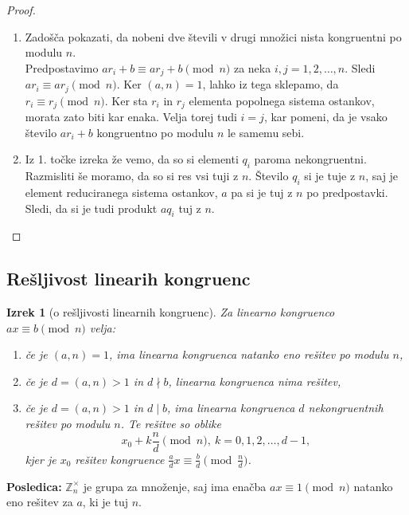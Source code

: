 \documentclass[12pt, a4paper]{article}
\newtheorem{izr}{Izrek}
\newenvironment{posl}[1][]{\par\medskip\noindent \textbf{Posledica: }}{\medskip}
\begin{document}
\begin{proof}
\begin{enumerate}
\item Zadošča pokazati, da nobeni dve števili v drugi množici nista kongruentni po modulu $n$.\\
Predpostavimo $ar_{i}+b\equiv ar_{j}+b \pmod n$ za neka $i,j =1,2,\ldots,n$. Sledi  $ar_{i}\equiv ar_{j} \pmod n$. Ker $(a,n)=1$, lahko iz tega sklepamo, da $r_{i} \equiv r_{j} \pmod n$. Ker sta $r_{i}$ in $r_{j}$ elementa popolnega sistema ostankov, morata zato biti kar enaka. Velja torej tudi $i=j$, kar pomeni, da je vsako število $ar_{i}+b$ kongruentno po modulu $n$ le samemu sebi.
\item Iz 1. točke izreka že vemo, da so si elementi $q_{i}$ paroma nekongruentni. Razmisliti še moramo, da so si res vsi tuji z $n$. Število $q_{i}$ si je tuje z $n$, saj je element reduciranega sistema ostankov, $a$ pa si je tuj z $n$ po predpostavki. Sledi, da si je tudi produkt $aq_{i}$ tuj z $n$.
\end{enumerate}
\end{proof}

\subsection{Rešljivost linearih kongruenc}

\begin{izr}[o rešljivosti linearnih kongruenc]
Za linearno kongruenco $ax\equiv b \pmod n$ velja:
\begin{enumerate}
\item če je $(a,n)=1$, ima linearna kongruenca natanko eno rešitev po modulu $n$,
\item če je $d=(a,n)>1$ in $d\nmid b$, linearna kongruenca nima rešitev,
\item če je $d=(a,n)>1$ in $d\mid b$, ima linearna kongruenca $d$ nekongruentnih rešitev po modulu $n$. Te rešitve so oblike
$$x_{0}+k\frac{n}{d} \pmod n,\ k=0,1,2,\ldots,d-1,$$
kjer je $x_{0}$ rešitev kongruence $\frac{a}{d}x\equiv \frac{b}{d} \pmod{\frac{n}{d}}$.
\end{enumerate}
\end{izr}

\begin{posl}
$\mathbb{Z}_{n}^{\times}$ je grupa za množenje, saj ima enačba $ax\equiv 1 \pmod n$ natanko eno rešitev za $a$, ki je tuj $n$.
\end{posl}
\end{document}
